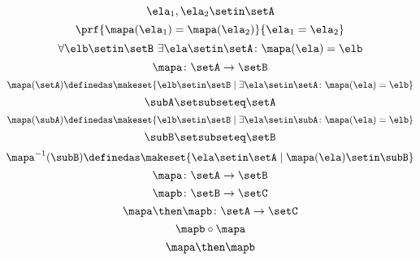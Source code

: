 \begin{forslides}
\begin{equation}\label{eq:slides_session2_122}
\ela_1, \ela_2 \setin\setA
\end{equation}
\begin{equation}\label{eq:slides_session2_123}
\prf{\mapa(\ela_1) = \mapa(\ela_2)}{\ela_1 = \ela_2}
\end{equation}
\begin{equation}\label{eq:slides_session2_124}
\forall \elb \setin\setB \ \exists  \ela \setin\setA \colon \mapa(\ela) = \elb
\end{equation}
\begin{equation}\label{eq:slides_session2_125}
\mapa\colon \setA \to \setB
\end{equation}
\begin{equation}\label{eq:slides_session2_126}
\mapa(\setA) \definedas \makeset{ \elb \setin\setB \mid \exists \ela \setin\setA \colon \mapa(\ela) = \elb }
\end{equation}
\begin{equation}\label{eq:slides_session2_127}
\subA \setsubseteq \setA
\end{equation}
\begin{equation}\label{eq:slides_session2_128}
\mapa(\subA) \definedas \makeset{ \elb \setin\setB \mid \exists \ela \setin \subA \colon \mapa(\ela) = \elb }
\end{equation}
\begin{equation}\label{eq:slides_session2_129}
\subB \setsubseteq \setB
\end{equation}
\begin{equation}\label{eq:slides_session2_130}
\mapa^{-1}(\subB) \definedas \makeset{ \ela \setin\setA \mid  \mapa(\ela) \setin \subB} 
\end{equation}
\begin{equation}\label{eq:slides_session2_131}
\mapa\colon \setA \to \setB
\end{equation}
\begin{equation}\label{eq:slides_session2_132}
\mapb \colon \setB \to \setC
\end{equation}
\begin{equation}\label{eq:slides_session2_133}
\mapa \then \mapb \colon \setA \to \setC
\end{equation}
\begin{equation}\label{eq:slides_session2_134}
\mapb \circ \mapa
\end{equation}
\begin{equation}\label{eq:slides_session2_135}
\mapa \then \mapb

\end{equation}
\end{forslides}
